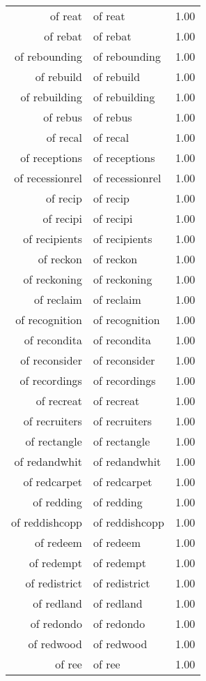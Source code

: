\begin{table}[ht]
\begin{tabular}{rlr}
  of reat & of reat & 1.00 \\ 
  of rebat & of rebat & 1.00 \\ 
  of rebounding & of rebounding & 1.00 \\ 
  of rebuild & of rebuild & 1.00 \\ 
  of rebuilding & of rebuilding & 1.00 \\ 
  of rebus & of rebus & 1.00 \\ 
  of recal & of recal & 1.00 \\ 
  of receptions & of receptions & 1.00 \\ 
  of recessionrel & of recessionrel & 1.00 \\ 
  of recip & of recip & 1.00 \\ 
  of recipi & of recipi & 1.00 \\ 
  of recipients & of recipients & 1.00 \\ 
  of reckon & of reckon & 1.00 \\ 
  of reckoning & of reckoning & 1.00 \\ 
  of reclaim & of reclaim & 1.00 \\ 
  of recognition & of recognition & 1.00 \\ 
  of recondita & of recondita & 1.00 \\ 
  of reconsider & of reconsider & 1.00 \\ 
  of recordings & of recordings & 1.00 \\ 
  of recreat & of recreat & 1.00 \\ 
  of recruiters & of recruiters & 1.00 \\ 
  of rectangle & of rectangle & 1.00 \\ 
  of redandwhit & of redandwhit & 1.00 \\ 
  of redcarpet & of redcarpet & 1.00 \\ 
  of redding & of redding & 1.00 \\ 
  of reddishcopp & of reddishcopp & 1.00 \\ 
  of redeem & of redeem & 1.00 \\ 
  of redempt & of redempt & 1.00 \\ 
  of redistrict & of redistrict & 1.00 \\ 
  of redland & of redland & 1.00 \\ 
  of redondo & of redondo & 1.00 \\ 
  of redwood & of redwood & 1.00 \\ 
  of ree & of ree & 1.00 \\ 

\end{tabular}
\end{table}
